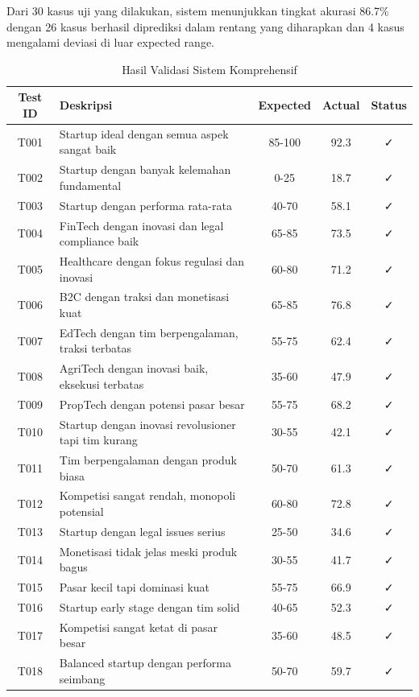 \documentclass[12pt,a4paper]{article}
\begin{document}
Dari 30 kasus uji yang dilakukan, sistem menunjukkan tingkat akurasi 86.7\% dengan 26 kasus berhasil diprediksi dalam rentang yang diharapkan dan 4 kasus mengalami deviasi di luar expected range.

\begin{table}[H]
\centering
\caption{Hasil Validasi Sistem Komprehensif}
\label{tab:validation-comprehensive}
\begin{tabular}{@{}clccc@{}}
\toprule
\textbf{Test ID} & \textbf{Deskripsi} & \textbf{Expected} & \textbf{Actual} & \textbf{Status} \\
\midrule
T001 & Startup ideal dengan semua aspek sangat baik & 85-100 & 92.3 & ✓ \\
T002 & Startup dengan banyak kelemahan fundamental & 0-25 & 18.7 & ✓ \\
T003 & Startup dengan performa rata-rata & 40-70 & 58.1 & ✓ \\
T004 & FinTech dengan inovasi dan legal compliance baik & 65-85 & 73.5 & ✓ \\
T005 & Healthcare dengan fokus regulasi dan inovasi & 60-80 & 71.2 & ✓ \\
T006 & B2C dengan traksi dan monetisasi kuat & 65-85 & 76.8 & ✓ \\
T007 & EdTech dengan tim berpengalaman, traksi terbatas & 55-75 & 62.4 & ✓ \\
T008 & AgriTech dengan inovasi baik, eksekusi terbatas & 35-60 & 47.9 & ✓ \\
T009 & PropTech dengan potensi pasar besar & 55-75 & 68.2 & ✓ \\
T010 & Startup dengan inovasi revolusioner tapi tim kurang & 30-55 & 42.1 & ✓ \\
T011 & Tim berpengalaman dengan produk biasa & 50-70 & 61.3 & ✓ \\
T012 & Kompetisi sangat rendah, monopoli potensial & 60-80 & 72.8 & ✓ \\
T013 & Startup dengan legal issues serius & 25-50 & 34.6 & ✓ \\
T014 & Monetisasi tidak jelas meski produk bagus & 30-55 & 41.7 & ✓ \\
T015 & Pasar kecil tapi dominasi kuat & 55-75 & 66.9 & ✓ \\
T016 & Startup early stage dengan tim solid & 40-65 & 52.3 & ✓ \\
T017 & Kompetisi sangat ketat di pasar besar & 35-60 & 48.5 & ✓ \\
T018 & Balanced startup dengan performa seimbang & 50-70 & 59.7 & ✓ \\

\end{tabular}
\end{table}
\end{document}
